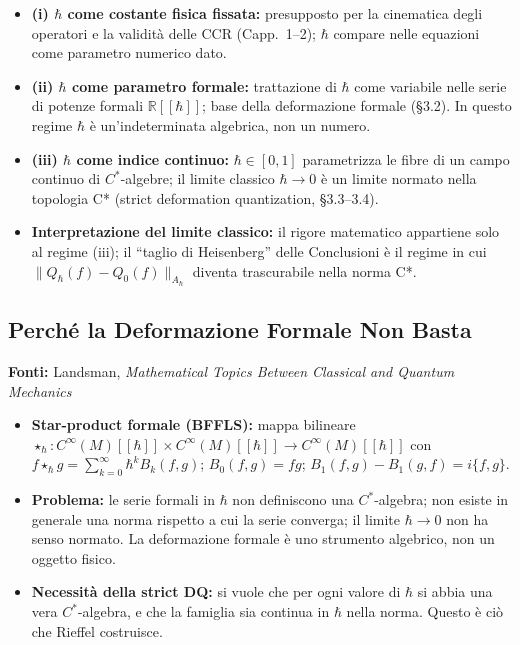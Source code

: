 \documentclass[12pt, a4paper]{article}
\newcommand{\fonti}[1]{%
	\begin{fontebox}
		\textcolor{fontecolor}{\footnotesize\textbf{Fonti:} #1}
	\end{fontebox}%
}
\begin{document}
	\begin{itemize}
		\item \textbf{(i) $\hbar$ come costante fisica fissata:} presupposto per la cinematica
		degli operatori e la validità delle CCR (Capp.\ 1--2); $\hbar$ compare nelle equazioni
		come parametro numerico dato.
		\item \textbf{(ii) $\hbar$ come parametro formale:} trattazione di $\hbar$ come
		variabile nelle serie di potenze formali $\mathbb{R}[[\hbar]]$; base della deformazione
		formale (§3.2). In questo regime $\hbar$ è un'indeterminata algebrica, non un numero.
		\item \textbf{(iii) $\hbar$ come indice continuo:} $\hbar \in [0, 1]$ parametrizza le
		fibre di un campo continuo di $C^*$-algebre; il limite classico $\hbar \to 0$ è un
		limite normato nella topologia C* (strict deformation quantization, §3.3--3.4).
		\item \textbf{Interpretazione del limite classico:} il rigore matematico appartiene
		solo al regime (iii); il ``taglio di Heisenberg'' delle Conclusioni è il regime in
		cui $\|Q_\hbar(f) - Q_0(f)\|_{A_\hbar}$ diventa trascurabile nella norma C*.
	\end{itemize}
	
	\subsection{Perché la Deformazione Formale Non Basta}
	
	\fonti{Landsman, \textit{Mathematical Topics Between Classical and Quantum Mechanics}}
	
	\begin{itemize}
		\item \textbf{Star-product formale (BFFLS):} mappa bilineare $\star_\hbar:
		C^\infty(M)[[\hbar]] \times C^\infty(M)[[\hbar]] \to C^\infty(M)[[\hbar]]$ con
		$f \star_\hbar g = \sum_{k=0}^\infty \hbar^k B_k(f,g)$; $B_0(f,g) = fg$;
		$B_1(f,g) - B_1(g,f) = i\{f,g\}$.
		\item \textbf{Problema:} le serie formali in $\hbar$ non definiscono una
		$C^*$-algebra; non esiste in generale una norma rispetto a cui la serie converga;
		il limite $\hbar \to 0$ non ha senso normato. La deformazione formale è uno
		strumento algebrico, non un oggetto fisico.
		\item \textbf{Necessità della strict DQ:} si vuole che per ogni valore di $\hbar$
		si abbia una vera $C^*$-algebra, e che la famiglia sia continua in $\hbar$ nella
		norma. Questo è ciò che Rieffel costruisce.
	\end{itemize}
	
\end{document}
